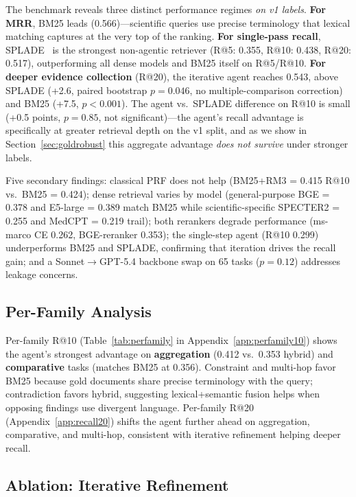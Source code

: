 \documentclass{article}
\begin{document}
The benchmark reveals three distinct performance regimes \emph{on v1 labels}. \textbf{For MRR}, BM25 leads (0.566)---scientific queries use precise terminology that lexical matching captures at the very top of the ranking. \textbf{For single-pass recall}, SPLADE~\cite{splade2022} is the strongest non-agentic retriever (R@5: 0.355, R@10: 0.438, R@20: 0.517), outperforming all dense models and BM25 itself on R@5/R@10. \textbf{For deeper evidence collection} (R@20), the iterative agent reaches 0.543, above SPLADE (+2.6, paired bootstrap $p{=}0.046$, no multiple-comparison correction) and BM25 (+7.5, $p{<}0.001$). The agent vs.\ SPLADE difference on R@10 is small (+0.5 points, $p{=}0.85$, not significant)---the agent's recall advantage is specifically at greater retrieval depth on the v1 split, and as we show in Section~\ref{sec:goldrobust} this aggregate advantage \emph{does not survive} under stronger labels.

Five secondary findings: classical PRF does not help (BM25+RM3 = 0.415 R@10 vs.\ BM25 = 0.424); dense retrieval varies by model (general-purpose BGE = 0.378 and E5-large = 0.389 match BM25 while scientific-specific SPECTER2 = 0.255 and MedCPT = 0.219 trail); both rerankers degrade performance (ms-marco CE 0.262, BGE-reranker 0.353); the single-step agent (R@10 0.299) underperforms BM25 and SPLADE, confirming that iteration drives the recall gain; and a Sonnet$\to$GPT-5.4 backbone swap on 65 tasks ($p{=}0.12$) addresses leakage concerns.

\subsection{Per-Family Analysis}

Per-family R@10 (Table~\ref{tab:perfamily} in Appendix~\ref{app:perfamily10}) shows the agent's strongest advantage on \textbf{aggregation} (0.412 vs.\ 0.353 hybrid) and \textbf{comparative} tasks (matches BM25 at 0.356). Constraint and multi-hop favor BM25 because gold documents share precise terminology with the query; contradiction favors hybrid, suggesting lexical+semantic fusion helps when opposing findings use divergent language. Per-family R@20 (Appendix~\ref{app:recall20}) shifts the agent further ahead on aggregation, comparative, and multi-hop, consistent with iterative refinement helping deeper recall.

\subsection{Ablation: Iterative Refinement}
\end{document}
